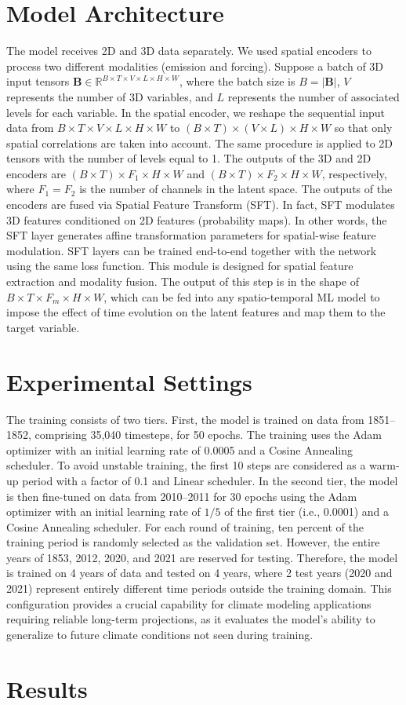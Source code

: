 \documentclass{article}
\begin{document}
\section{Model Architecture}
    The model receives 2D and 3D data separately. We used spatial encoders to process two different modalities (emission and forcing). Suppose a batch of 3D input tensors $\mathbf{B} \in \mathbb{R}^{B \times T \times V \times L \times H \times W}$, where the batch size is $B = |\mathbf{B}|$, $V$ represents the number of 3D variables, and $L$ represents the number of associated levels for each variable. In the spatial encoder, we reshape the sequential input data from $B \times T \times V \times L \times H \times W$ to $(B \times T) \times (V \times L) \times H \times W$ so that only spatial correlations are taken into account. The same procedure is applied to 2D tensors with the number of levels equal to 1. The outputs of the 3D and 2D encoders are $(B \times T) \times F_1 \times H \times W$ and $(B \times T) \times F_2 \times H \times W$, respectively, where $F_1 = F_2$ is the number of channels in the latent space. The outputs of the encoders are fused via Spatial Feature Transform (SFT). In fact, SFT modulates 3D features conditioned on 2D features (probability maps). In other words, the SFT layer generates affine transformation parameters for spatial-wise feature modulation. SFT layers can be trained end-to-end together with the network using the same loss function. This module is designed for spatial feature extraction and modality fusion. The output of this step is in the shape of $B \times T \times F_m \times H \times W$, which can be fed into any spatio-temporal ML model to impose the effect of time evolution on the latent features and map them to the target variable.

\section{Experimental Settings}
    The training consists of two tiers. First, the model is trained on data from 1851--1852, comprising 35,040 timesteps, for 50 epochs. The training uses the Adam optimizer with an initial learning rate of 0.0005 and a Cosine Annealing scheduler. To avoid unstable training, the first 10 steps are considered as a warm-up period with a factor of 0.1 and Linear scheduler. In the second tier, the model is then fine-tuned on data from 2010--2011 for 30 epochs using the Adam optimizer with an initial learning rate of $1/5$ of the first tier (i.e., 0.0001) and a Cosine Annealing scheduler. For each round of training, ten percent of the training period is randomly selected as the validation set. However, the entire years of 1853, 2012, 2020, and 2021 are reserved for testing. Therefore, the model is trained on 4 years of data and tested on 4 years, where 2 test years (2020 and 2021) represent entirely different time periods outside the training domain. This configuration provides a crucial capability for climate modeling applications requiring reliable long-term projections, as it evaluates the model's ability to generalize to future climate conditions not seen during training.

\section{Results}
    



    





\end{document}
